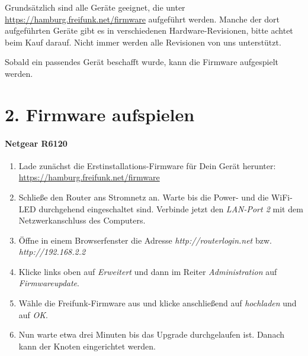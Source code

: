 \documentclass[10pt,a4paper,notumble]{leaflet}
\begin{document}
Grundsätzlich sind alle Geräte geeignet, die unter \mbox{\href{https://hamburg.freifunk.net/firmware}{https://hamburg.freifunk.net/firmware}} aufgeführt werden. Manche der dort aufgeführten Geräte gibt es in verschiedenen Hardware-Revisionen, bitte achtet beim Kauf darauf. Nicht immer werden alle Revisionen von uns unterstützt.

Sobald ein passendes Gerät beschafft wurde, kann die Firmware aufgespielt werden.


\newpage


\section{2. Firmware aufspielen}

\paragraph{Netgear R6120}
\begin{enumerate}
 \item Lade zunächst die Erstinstallations-Firmware für Dein Gerät herunter: \mbox{\href{https://hamburg.freifunk.net/firmware}{https://hamburg.freifunk.net/firmware}}
 \item Schließe den Router ans Stromnetz an. Warte bis die Power- und die WiFi-LED durchgehend eingeschaltet sind. Verbinde jetzt den \textit{LAN-Port 2} mit dem Netzwerkanschluss des Computers.
 \item Öffne in einem Browserfenster die Adresse \textit{http://routerlogin.net} bzw. \textit{http://192.168.2.2}
 \item Klicke links oben auf \textit{Erweitert} und dann im Reiter \textit{Administration} auf \textit{Firmwareupdate}.
 \item Wähle die Freifunk-Firmware aus und klicke anschließend auf \textit{hochladen} und auf \textit{OK}.
 \item Nun warte etwa drei Minuten bis das Upgrade durchgelaufen ist. Danach kann der Knoten eingerichtet werden.
\end{enumerate}
\end{document}
